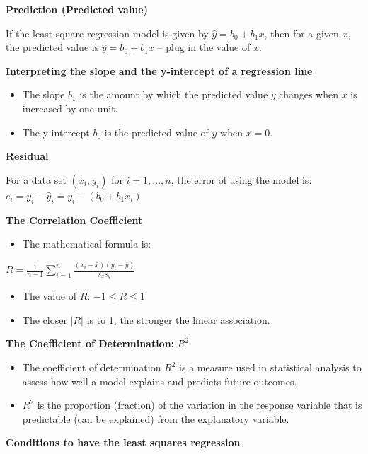 \documentclass[
]{book}
\providecommand{\tightlist}{%
  \setlength{\itemsep}{0pt}\setlength{\parskip}{0pt}}
\begin{document}
\textbf{Prediction (Predicted value)}

If the least square regression model is given by \(\hat{y} = b_0 + b_1x\), then for a given \(x\), the predicted value is \(\hat{y} = b_0 + b_1x\) -- plug in the value of \(x\).

\textbf{Interpreting the slope and the y-intercept of a regression line}

\begin{itemize}
\item
  The slope \(b_1\) is the amount by which the predicted value \(y\) changes when \(x\) is increased by one unit.
\item
  The y-intercept \(b_0\) is the predicted value of \(y\) when \(x = 0\).
\end{itemize}

\textbf{Residual}

For a data set \((x_i, y_i)\) for \(i = 1, \ldots, n\), the error of using the model is: \(e_i = y_i - \hat{y}_i = y_i - (b_0 + b_1x_i)\)

\textbf{The Correlation Coefficient}

\begin{itemize}
\tightlist
\item
  The mathematical formula is:
\end{itemize}

\(R = \frac{1}{n-1}\sum_{i=1}^n \frac{(x_i - \bar{x})(y_i - \bar{y})}{s_x s_y}\)

\begin{itemize}
\item
  The value of \(R\): \(-1 \leq R \leq 1\)
\item
  The closer \(|R|\) is to 1, the stronger the linear association.
\end{itemize}

\textbf{The Coefficient of Determination:} \(R^2\)

\begin{itemize}
\item
  The coefficient of determination \(R^2\) is a measure used in statistical analysis to assess how well a model explains and predicts future outcomes.
\item
  \(R^2\) is the proportion (fraction) of the variation in the response variable that is predictable (can be explained) from the explanatory variable.
\end{itemize}

\textbf{Conditions to have the least squares regression}
\end{document}
